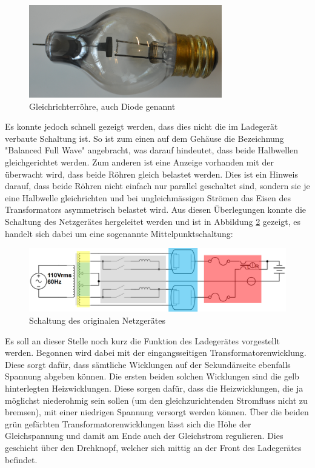 \begin{figure}[h]
	\centering
		\includegraphics[width=0.75\textwidth]{images/Roehre_Diode.jpg}
	\caption{Gleichrichterröhre, auch Diode genannt}
	\label{fig:Roehre_Diode}
\end{figure}

Es konnte jedoch schnell gezeigt werden, dass dies nicht die im Ladegerät verbaute Schaltung ist. So ist zum einen auf dem Gehäuse die Bezeichnung "Balanced Full Wave" angebracht, was darauf hindeutet, dass beide Halbwellen gleichgerichtet werden. Zum anderen ist eine Anzeige vorhanden mit der überwacht wird, dass beide Röhren gleich belastet werden. Dies ist ein Hinweis darauf, dass beide Röhren nicht einfach nur parallel geschaltet sind, sondern sie je eine Halbwelle gleichrichten und bei ungleichmässigen Strömen das Eisen des Transformators asymmetrisch belastet wird. Aus diesen Überlegungen konnte die Schaltung des Netzgerätes hergeleitet werden und ist in Abbildung \ref{fig:Schema_Ladegeraet_Alt} gezeigt, es handelt sich dabei um eine sogenannte Mittelpunktschaltung:

\begin{figure}[h]
	\centering
		\includegraphics[width=1.00\textwidth]{images/Ladegeraet_Alt_2.PNG}
	\caption{Schaltung des originalen Netzgerätes}
	\label{fig:Schema_Ladegeraet_Alt}
\end{figure}

Es soll an dieser Stelle noch kurz die Funktion des Ladegerätes vorgestellt werden. Begonnen wird dabei mit der eingangsseitigen Transformatorenwicklung. Diese sorgt dafür, dass sämtliche Wicklungen auf der Sekundärseite ebenfalls Spannung abgeben können. Die ersten beiden solchen Wicklungen sind die gelb hinterlegten Heizwicklungen. Diese sorgen dafür, dass die Heizwicklungen, die ja möglichst niederohmig sein sollen (um den gleichzurichtenden Stromfluss nicht zu bremsen), mit einer niedrigen Spannung versorgt werden können. Über die beiden grün gefärbten Transformatorenwicklungen lässt sich die Höhe der Gleichspannung und damit am Ende auch der Gleichstrom regulieren. Dies geschieht über den Drehknopf, welcher sich mittig an der Front des Ladegerätes befindet.

